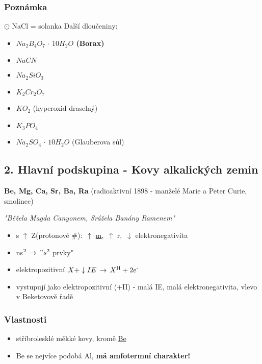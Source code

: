 \documentclass{article}
\def\SP#1{\textsuperscript{#1}}
\def\WATER{H_2O}
\begin{document}
    \subsubsection{Poznámka}
    $\odot$ NaCl = solanka
    \newline
    \newline
    Další dloučeniny:
    \begin{itemize}
        \item \textbf{$ Na _2 B _4 O _7 \, \cdot \, 10 \WATER$ (Borax)}
        \item $NaCN$
        \item $Na_2SiO_3$
        \item $K _2 Cr _2 O _7$
        \item $K O _2$ (hyperoxid draselný)
        \item $K _3 P O _4$
        \item $Na _2 SO _4 \, \cdot \, 10 \WATER$ (Glauberova sůl)
    \end{itemize}

\newpage
\subsection{2. Hlavní podskupina - Kovy alkalických zemin}
    \textbf{Be, Mg, Ca, Sr, Ba, Ra} (radioaktivní 1898 - manželé Marie a Peter Curie, smolinec)

    \textit{"Běžela Magda Canyonem, Srážela Banány Ramenem"}

    \begin{itemize}
        \item s $\uparrow$ Z(protonové \#): $\,\uparrow$ \underline{m}, $\,\uparrow$ r, $\,\downarrow$ elektronegativita
        \item ns$\SP{2}$ \fbox{$\uparrow \downarrow$} $\rightarrow \," s\SP{2}$ prvky"
        \item elektropozitivní \(X + \downarrow IE \,\to\,X\SP{II} + 2e\SP{-}\)
        \item vystupují jako elektropozitivní (+II) - malá IE, malá elektronegativita, vlevo v Beketovově řadě
    \end{itemize}

    \subsubsection{Vlastnosti}
        \begin{itemize}
            \item stříbrolesklé měkké kovy, kromě \underline{Be}
            \item Be se nejvíce podobá Al, \textbf{má amfotermní charakter!}
        \end{itemize}
\end{document}

